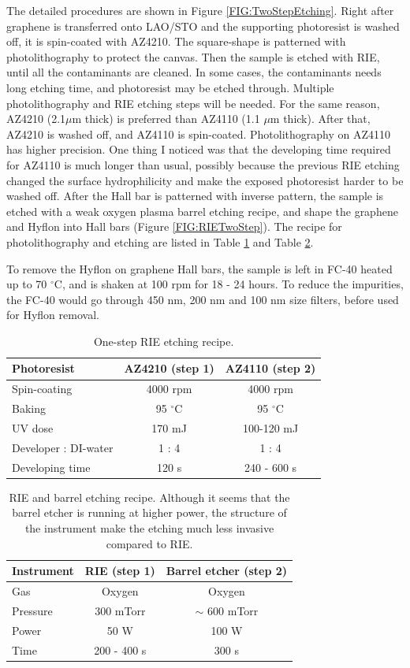 \documentclass[pdflatex, sectionletters, 12pt]{pittetd}    %
\begin{document}
The detailed procedures are shown in Figure \ref{FIG:TwoStepEtching}. Right after graphene is transferred onto LAO/STO and the supporting photoresist is washed off, it is spin-coated with AZ4210. The square-shape is patterned with photolithography to protect the canvas. Then the sample is etched with RIE, until all the contaminants are cleaned. In some cases, the contaminants needs long etching time, and photoresist may be etched through. Multiple photolithography and RIE etching steps will be needed. For the same reason, AZ4210 (2.1$\mu$m thick) is preferred than AZ4110 (1.1 $\mu$m thick). After that, AZ4210 is washed off, and AZ4110 is spin-coated. Photolithography on AZ4110 has higher precision. One thing I noticed was that the developing time required for AZ4110 is much longer than usual, possibly because the previous RIE etching changed the surface hydrophilicity and make the exposed photoresist harder to be washed off. After the Hall bar is patterned with inverse pattern, the sample is etched with a weak oxygen plasma barrel etching recipe, and shape the graphene and Hyflon into Hall bars (Figure \ref{FIG:RIETwoStep}). The recipe for photolithography and etching are listed in Table \ref{TAB:TwoStepPL} and Table \ref{TAB:TwoStepEtching}.

To remove the Hyflon on graphene Hall bars, the sample is left in FC-40 heated up to 70 $^{\circ}$C, and is shaken at 100 rpm for 18 - 24 hours. To reduce the impurities, the FC-40 would go through 450 nm, 200 nm and 100 nm size filters, before used for Hyflon removal.

\begin{table}
	\centering
	\begin{tabular}{l|cc}
		\hline
		Photoresist	& AZ4210 (step 1) & AZ4110 (step 2) \\ \hline
		Spin-coating	&	4000 rpm	&	4000 rpm \\ 
		Baking	&	95 $^{\circ}$C	&	95 $^{\circ}$C	\\ 
		UV dose	&	170 mJ	&	100-120 mJ	\\
		Developer : DI-water	&	1 : 4 &	1 : 4 \\ 
		Developing time	&	120 s	&	240 - 600 s \\
		\hline
	\end{tabular}
	\caption{One-step RIE etching recipe.}
	\label{TAB:TwoStepPL}
\end{table}

\begin{table}
	\centering
	\begin{tabular}{l|cc}
		\hline
		Instrument	& RIE (step 1)	&	Barrel etcher (step 2) \\ \hline
		Gas	&	Oxygen &	Oxygen \\ 
		Pressure	&	300 mTorr	&	$\sim$ 600 mTorr \\
		Power	&	50 W	&	100 W \\
		Time	&	200 - 400 s &	300 s\\ \hline
	\end{tabular}
	\caption{RIE and barrel etching recipe. Although it seems that the barrel etcher is running at higher power, the structure of the instrument make the etching much less invasive compared to RIE.}
	\label{TAB:TwoStepEtching}
\end{table}
\end{document}
